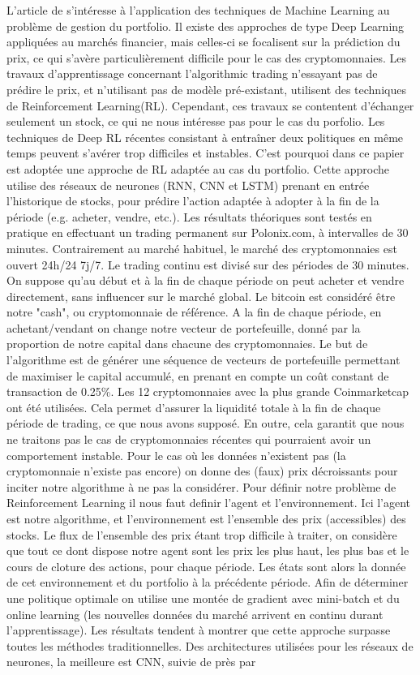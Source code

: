 \documentclass[a4paper, 10pt]{article}
\begin{document}
L'article de \textbf{\citet{Jiang2017} } s'intéresse à l'application des techniques de Machine Learning au problème de gestion du portfolio. Il existe des approches de type Deep Learning appliquées au marchés financier, mais celles-ci se focalisent sur la prédiction du prix, ce qui s'avère particulièrement difficile pour le cas des cryptomonnaies. Les travaux d'apprentissage concernant l'algorithmic trading n'essayant pas de prédire le prix, et n'utilisant pas de modèle pré-existant, utilisent des techniques de Reinforcement Learning(RL). Cependant, ces travaux se contentent d'échanger seulement un stock, ce qui ne nous intéresse pas pour le cas du porfolio. Les techniques de Deep RL récentes consistant à entraîner deux politiques en même temps peuvent s'avérer trop difficiles et instables. C'est pourquoi dans ce papier est adoptée une approche de RL adaptée au cas du portfolio. Cette approche utilise des réseaux de neurones (RNN, CNN et LSTM) prenant en entrée l'historique de stocks, pour prédire l'action adaptée à adopter à la fin de la période (e.g. acheter, vendre, etc.). Les résultats théoriques sont testés en pratique en effectuant un trading permanent sur Polonix.com, à intervalles de 30 minutes. Contrairement au marché habituel, le marché des cryptomonnaies est ouvert 24h/24 7j/7. Le trading continu est divisé sur des périodes de 30 minutes. On suppose qu'au début et à la fin de chaque période on peut acheter et vendre directement, sans influencer sur le marché global. Le bitcoin est considéré être notre "cash", ou cryptomonnaie de référence. A la fin de chaque période, en achetant/vendant on change notre vecteur de portefeuille, donné par la proportion de notre capital dans chacune des cryptomonnaies. Le but de l'algorithme est de générer une séquence de vecteurs de portefeuille permettant de maximiser le capital accumulé, en prenant en compte un coût constant de transaction de 0.25\%. Les 12 cryptomonnaies avec la plus grande Coinmarketcap ont été utilisées. Cela permet d'assurer la liquidité totale à la fin de chaque période de trading, ce que nous avons supposé. En outre, cela garantit que nous ne traitons pas le cas de cryptomonnaies récentes qui pourraient avoir un comportement instable. Pour le cas où les données n'existent pas (la cryptomonnaie n'existe pas encore) on donne des (faux) prix décroissants pour inciter notre algorithme à ne pas la considérer. Pour définir notre problème de Reinforcement Learning il nous faut definir l'agent et l'environnement. Ici l'agent est notre algorithme, et l'environnement est l'ensemble des prix (accessibles) des stocks. Le flux de l'ensemble des prix étant trop difficile à traiter, on considère que tout ce dont dispose notre agent sont les prix les plus haut, les plus bas et le cours de cloture des actions, pour chaque période. Les états sont alors la donnée de cet environnement et du portfolio à la précédente période. Afin de déterminer une politique optimale on utilise une montée de gradient avec mini-batch et du online learning (les nouvelles données du marché arrivent en continu durant l'apprentissage). Les résultats tendent à montrer que cette approche surpasse toutes les méthodes traditionnelles. Des architectures utilisées pour les réseaux de neurones, la meilleure est CNN, suivie de près par 
\end{document}
